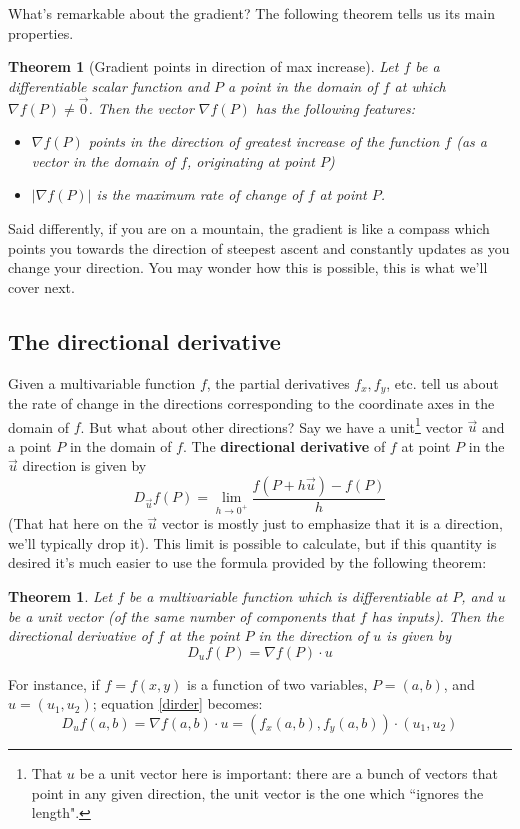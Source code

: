 \documentclass[12pt]{article}
\numberwithin{equation}{subsection}
\numberwithin{figure}{subsection}
\newtheorem{thm}[subsection]{Theorem}
\theoremstyle{note}
\begin{document}
{What's remarkable about the gradient? The following theorem tells us its main properties. 

\begin{thm}[Gradient points in direction of max increase] \label{gradient-properties} Let $f$ be a differentiable scalar function and $P$ a point in the domain of $f$ at which $\nabla f(P)\neq \vec{0}$. Then the vector $\nabla f(P)$ has the following features:
\begin{itemize}
\item $\nabla f(P)$ points in the direction of greatest increase of the function $f$ (as a vector in the domain of $f$, originating at point $P$)
\item $| \nabla f (P) |$ is the \textit{maximum rate of change} of $f$ at point $P$. 
\end{itemize}
\end{thm}

Said differently, if you are on a mountain, the gradient is like a compass which points you towards the direction of steepest ascent and constantly updates as you change your direction. You may wonder how this is possible, this is what we'll cover next. 

\subsection{The directional derivative}

Given a multivariable function $f$, the partial derivatives $f_x,f_y$, etc. tell us about the rate of change in the directions corresponding to the coordinate axes in the domain of $f$. But what about other directions? Say we have a unit\footnote{That $u$ be a unit vector here is important: there are a bunch of vectors that point in any given direction, the unit vector is the one which ``ignores the length".} vector $\vec{u}$ and a point $P$ in the domain of $f$. The \textbf{directional derivative} of $f$ at point $P$ in the $\vec{u}$ direction is given by \begin{equation} D_{\vec{u}} f(P)= \lim_{h\to 0^+} \dfrac{f(P+h \vec{u})-f(P)}{h} \end{equation} (That hat here on the $\vec{u}$ vector is mostly just to emphasize that it is a direction, we'll typically drop it). This limit is possible to calculate, but if this quantity is desired it's much easier to use the formula provided by the following theorem:

\begin{thm} Let $f$ be a multivariable function which is \textit{differentiable} at $P$, and $u$ be a unit vector (of the same number of components that $f$ has inputs). Then the {directional derivative} of $f$ at the point $P$ in the direction of $u$ is given by \begin{equation} \label{dirder} 
	D_u f(P)=\nabla f (P) \cdot u
\end{equation}
\end{thm}
For instance, if $f=f(x,y)$ is a function of two variables, $P=(a,b)$, and $u=(u_1,u_2)$; equation \eqref{dirder} becomes: \[ D_u f(a,b) = \nabla f(a,b) \cdot u= (f_x (a,b), f_y(a,b)) \cdot (u_1,u_2)\]

}
\end{document}
